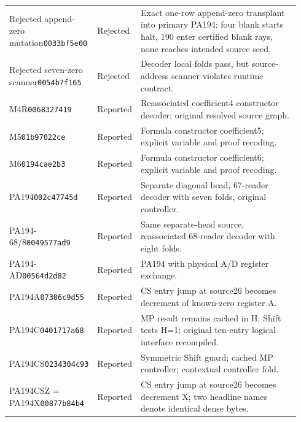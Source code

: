 \begin{longtable}{@{}p{0.245\linewidth}p{0.14\linewidth}p{0.55\linewidth}@{}}
Rejected append-zero mutation\newline\texttt{0033bf5e00} & Rejected & Exact one-row append-zero transplant into primary PA194; four blank starts halt, 190 enter certified blank rays, none reaches intended source seed. \\[2pt]
Rejected seven-zero scanner\newline\texttt{0054b7f165} & Rejected & Decoder local folds pass, but source-address scanner violates runtime contract. \\[2pt]
M4R\newline\texttt{0068327419} & Reported & Reassociated coefficient4 constructor decoder; original resolved source graph. \\[2pt]
M5\newline\texttt{01b97022ce} & Reported & Formula constructor coefficient5; explicit variable and proof recoding. \\[2pt]
M6\newline\texttt{0194cae2b3} & Reported & Formula constructor coefficient6; explicit variable and proof recoding. \\[2pt]
PA194\newline\texttt{002c47745d} & Reported & Separate diagonal head, 67-reader decoder with seven folds, original controller. \\[2pt]
PA194-68/8\newline\texttt{0049577ad9} & Reported & Same separate-head source, reassociated 68-reader decoder with eight folds. \\[2pt]
PA194-AD\newline\texttt{00564d2d82} & Reported & PA194 with physical A/D register exchange. \\[2pt]
PA194A\newline\texttt{07306c9d55} & Reported & CS entry jump at source26 becomes decrement of known-zero register A. \\[2pt]
PA194C\newline\texttt{0401717a68} & Reported & MP result remains cached in H; Shift tests H=1; original ten-entry logical interface recompiled. \\[2pt]
PA194CS\newline\texttt{0234304c93} & Reported & Symmetric Shift guard; cached MP controller; contextual controller fold. \\[2pt]
PA194CSZ = PA194X\newline\texttt{00877b84b4} & Reported & CS entry jump at source26 becomes decrement X; two headline names denote identical dense bytes. \\[2pt]

\end{longtable}

